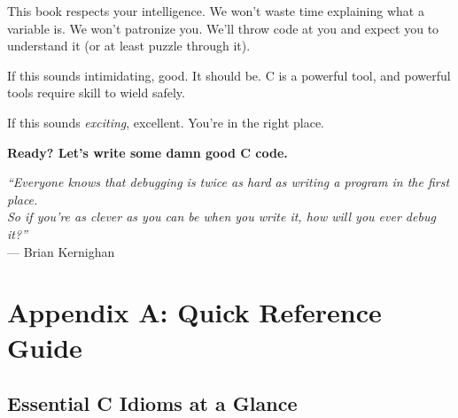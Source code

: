 \documentclass[10pt,openany]{book}
\begin{document}
This book respects your intelligence. We won't waste time explaining what a variable is. We won't patronize you. We'll throw code at you and expect you to understand it (or at least puzzle through it).

If this sounds intimidating, good. It should be. C is a powerful tool, and powerful tools require skill to wield safely.

If this sounds \textit{exciting}, excellent. You're in the right place.

\vspace{1em}

\textbf{Ready? Let's write some damn good C code.}

\vspace{2em}

\begin{center}
\textit{``Everyone knows that debugging is twice as hard as writing a program in the first place.\\
So if you're as clever as you can be when you write it, how will you ever debug it?''}\\
\vspace{0.5em}
--- Brian Kernighan
\end{center}

\mainmatter




















\backmatter

\chapter{Appendix A: Quick Reference Guide}

\section*{Essential C Idioms at a Glance}
\end{document}
